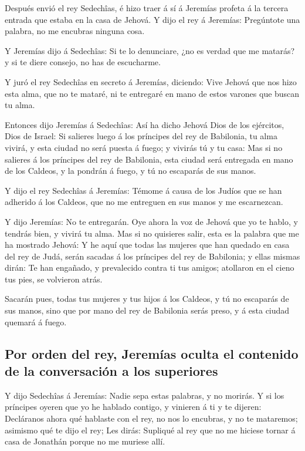  Después envió el rey Sedechîas, é hizo traer á sí á
Jeremías profeta á la tercera entrada que estaba en la casa de Jehová. Y
dijo el rey á Jeremías: Pregúntote una palabra, no me encubras ninguna
cosa.

 Y Jeremías dijo á Sedechîas: Si te lo denunciare, ¿no es
verdad que me matarás? y si te diere consejo, no has de escucharme.

 Y juró el rey Sedechîas en secreto á Jeremías, diciendo:
Vive Jehová que nos hizo esta alma, que no te mataré, ni te entregaré en
mano de estos varones que buscan tu alma.

 Entonces dijo Jeremías á Sedechîas: Así ha dicho Jehová
Dios de los ejércitos, Dios de Israel: Si salieres luego á los príncipes
del rey de Babilonia, tu alma vivirá, y esta ciudad no será puesta á
fuego; y vivirás tú y tu casa:  Mas si no salieres á los
príncipes del rey de Babilonia, esta ciudad será entregada en mano de
los Caldeos, y la pondrán á fuego, y tú no escaparás de sus manos.

 Y dijo el rey Sedechîas á Jeremías: Témome á causa de los
Judíos que se han adherido á los Caldeos, que no me entreguen en sus
manos y me escarnezcan.

 Y dijo Jeremías: No te entregarán. Oye ahora la voz de
Jehová que yo te hablo, y tendrás bien, y vivirá tu alma. 
Mas si no quisieres salir, esta es la palabra que me ha mostrado Jehová:
 Y he aquí que todas las mujeres que han quedado en casa
del rey de Judá, serán sacadas á los príncipes del rey de Babilonia; y
ellas mismas dirán: Te han engañado, y prevalecido contra ti tus amigos;
atollaron en el cieno tus pies, se volvieron atrás.

 Sacarán pues, todas tus mujeres y tus hijos á los Caldeos,
y tú no escaparás de sus manos, sino que por mano del rey de Babilonia
serás preso, y á esta ciudad quemará á fuego.

\hypertarget{por-orden-del-rey-jeremuxedas-oculta-el-contenido-de-la-conversaciuxf3n-a-los-superiores}{%
\subsection{Por orden del rey, Jeremías oculta el contenido de la
conversación a los
superiores}\label{por-orden-del-rey-jeremuxedas-oculta-el-contenido-de-la-conversaciuxf3n-a-los-superiores}}

 Y dijo Sedechîas á Jeremías: Nadie sepa estas palabras, y
no morirás.  Y si los príncipes oyeren que yo he hablado
contigo, y vinieren á ti y te dijeren: Decláranos ahora qué hablaste con
el rey, no nos lo encubras, y no te mataremos; asimismo qué te dijo el
rey;  Les dirás: Supliqué al rey que no me hiciese tornar á
casa de Jonathán porque no me muriese allí.

